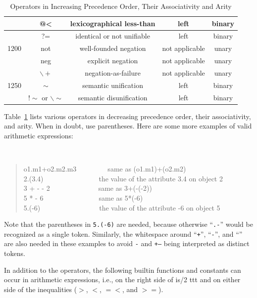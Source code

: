 \documentclass[11pt]{article}
\begin{document}
\begin{table}[tb]
{\begin{tabular}{|c|c|c|c|c|}
            & @< & lexicographical less-than & left & binary \\ \hline
            & ?= & identical or not unifiable & left & binary \\ \hline
1200        & not & well-founded negation & not applicable & unary \\ \cline{2-5}
            & neg & explicit negation & not applicable & unary \\ \cline{2-5}
            & $\backslash+$ & negation-as-failure & not applicable & unary \\ \hline
1250        & $\sim$ & semantic unification & left & binary \\ \cline{2-5}
            & $!\sim$ or $\backslash\sim$ & semantic disunification & left & binary \\ \cline{2-5}
\hline
\end{tabular}
}
\caption{Operators in Increasing Precedence Order, Their Associativity and Arity}
\label{tab:tab-op-pre}
\end{table}

Table~\ref{tab:tab-op-pre} lists various operators in decreasing precedence
order, their associativity, and arity.  When in doubt, use parentheses.
Here are some more examples of valid arithmetic expressions:
{\tt
\begin{quote}
o1.m1+o2.m2.m3~~~~~~~~~{\rm same as} (o1.m1)+(o2.m2)\\
2.(3.4)~~~~~~~~~~~~~~~~{\rm the value of the attribute} 3.4 {\rm on object} 2\\
3 + - - 2~~~~~~~~~~~~~~{\rm same as} 3+(-(-2))\\
5 * - 6~~~~~~~~~~~~~~~~{\rm same as} 5*(-6)\\
5.(-6)~~~~~~~~~~~~~~~~~{\rm the value of the attribute} -6 {\rm on object} 5
\end{quote}
}
Note that the parentheses in {\tt 5.(-6)} are needed,
because otherwise ``{\tt .-}'' would be recognized as a single token.
Similarly, the whitespace around ``{\tt +}'', ``{\tt -}'', and ``{\tt *}''
are also needed in these examples to avoid {\tt *-} and {\tt +--} being
interpreted as distinct tokens.

In addition to the operators, the following builtin functions and constants
can occur in arithmetic expressions, i.e., on the right side of is/2
ttt and on either side of the inequalities ($>$, $<$, $=<$, and $>=$).
\end{document}
